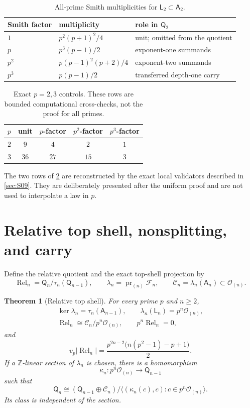 \documentclass[12pt,a4paper]{article}
\newtheorem{theorem}{Theorem}[section]
\theoremstyle{definition}
\newcommand{\Z}{\mathbb Z}
\newcommand{\A}{\mathsf A}
\newcommand{\OO}{\mathcal O}
\newcommand{\LL}{\mathsf L}
\newcommand{\QQ}{\mathsf Q}
\newcommand{\Rel}{\operatorname{Rel}}
\newcommand{\vp}{v_p}
\begin{document}
\begin{table}[t]
\centering
\caption{All-prime Smith multiplicities for
$\LL_2\subset\A_2$.}
\label{tab:smith-multiplicities}
\begin{tabular}{@{}lll@{}}
\toprule
Smith factor & multiplicity & role in $\QQ_2$\\
\midrule
$1$ & $p^2(p+1)^2/4$ & unit; omitted from the quotient\\
$p$ & $p^3(p-1)/2$ & exponent-one summands\\
$p^2$ & $p(p-1)^2(p+2)/4$ & exponent-two summands\\
$p^3$ & $p(p-1)/2$ & transferred depth-one carry\\
\bottomrule
\end{tabular}
\end{table}

\begin{table}[t]
\centering
\caption{Exact $p=2,3$ controls.  These rows are bounded computational
cross-checks, not the proof for all primes.}
\label{tab:finite-controls}
\begin{tabular}{@{}ccccc@{}}
\toprule
$p$ & unit & $p$-factor & $p^2$-factor & $p^3$-factor\\
\midrule
$2$ & $9$ & $4$ & $2$ & $1$\\
$3$ & $36$ & $27$ & $15$ & $3$\\
\bottomrule
\end{tabular}
\end{table}

The two rows of \cref{tab:finite-controls} are reconstructed by the exact local
validators described in \cref{sec:S09}.  They are deliberately presented
after the uniform proof and are not used to interpolate a law in $p$.

\section{Relative top shell, nonsplitting, and carry}\label{sec:S07}

Define the relative quotient and the exact top-shell projection by
\[
 \Rel_n=\QQ_n/\tau_n(\QQ_{n-1}),\qquad
 \lambda_n=\operatorname{pr}_{(n)}\mathcal F_n,\qquad
 \mathcal C_n=\lambda_n(\A_n)\subset\OO_{(n)}.
\]

\begin{theorem}[Relative top shell]
\label{thm:relative-top-shell}
For every prime $p$ and $n\geq2$,
\begin{gather}
 \ker\lambda_n=\tau_n(\A_{n-1}),\qquad
 \lambda_n(\LL_n)=p^n\OO_{(n)},\label{eq:top-kernel-image}\\
 \Rel_n\cong\mathcal C_n/p^n\OO_{(n)},\qquad
 p^n\Rel_n=0,\label{eq:relative-shell}
\end{gather}
and
\[
 \vp|\Rel_n|=
 \frac{p^{2n-2}\bigl(n(p^2-1)-p+1\bigr)}2.
\]
If a $\Z$-linear section of $\lambda_n$ is chosen, there is a homomorphism
\[
 \kappa_n:p^n\OO_{(n)}\longrightarrow\QQ_{n-1}
\]
such that
\begin{equation}\label{eq:kappa-graph}
 \QQ_n\cong
 (\QQ_{n-1}\oplus\mathcal C_n)
 \big/\langle(\kappa_n(c),c):c\in p^n\OO_{(n)}\rangle.
\end{equation}
Its class is independent of the section.
\end{theorem}
\end{document}
